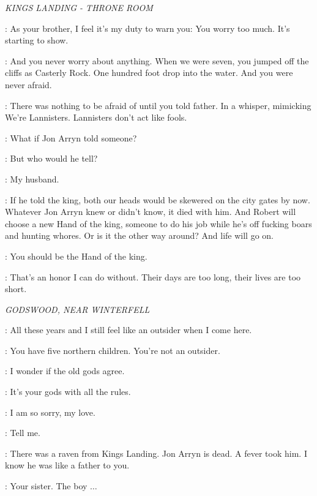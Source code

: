 \scene

\textit{KINGS LANDING - THRONE ROOM} 


\JAIME: As your brother, I feel it's my duty to warn you: You worry too much. It's starting to show. 

\CERSEI: And you never worry about anything. When we were seven, you jumped off the cliffs as Casterly Rock. One hundred foot drop into the water. And you were never afraid. 

\JAIME: There was nothing to be afraid of until you told father. In a whisper, mimicking We're Lannisters. Lannisters don't act like fools. 

\CERSEI: What if Jon Arryn told someone? 

\JAIME: But who would he tell? 

\CERSEI: My husband. 

\JAIME: If he told the king, both our heads would be skewered on the city gates by now. Whatever Jon Arryn knew or didn't know, it died with him. And Robert will choose a new Hand of the king, someone to do his job while he's off fucking boars and hunting whores. Or is it the other way around? And life will go on. 

\CERSEI: You should be the Hand of the king. 

\JAIME: That's an honor I can do without. Their days are too long, their lives are too short. 


\scene

\textit{GODSWOOD, NEAR WINTERFELL} 


\CATELYN: All these years and I still feel like an outsider when I come here. 

\NED: You have five northern children. You're not an outsider. 

\CATELYN: I wonder if the old gods agree. 

\NED: It's your gods with all the rules. 

\CATELYN: I am so sorry, my love. 

\NED: Tell me. 

\CATELYN: There was a raven from Kings Landing. Jon Arryn is dead. A fever took him. I know he was like a father to you. 

\NED: Your sister. The boy $\ldots$ 

